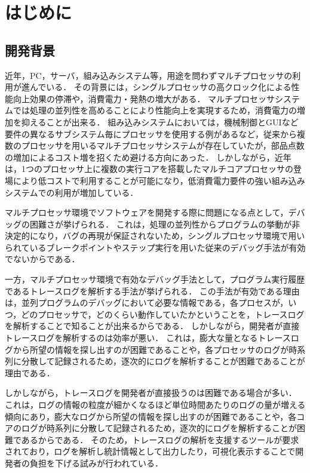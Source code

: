 \chapter{はじめに}

\section{開発背景}

近年，PC，サーバ，組み込みシステム等，用途を問わずマルチプロセッサの利用が進んでいる．
その背景には，シングルプロセッサの高クロック化による性能向上効果の停滞や，消費電力・発熱の増大がある．
マルチプロセッサシステムでは処理の並列性を高めることにより性能向上を実現するため，消費電力の増加を抑えることが出来る．
組み込みシステムにおいては，機械制御とGUIなど要件の異なるサブシステム毎にプロセッサを使用する例があるなど，従来から複数のプロセッサを用いるマルチプロセッサシステムが存在していたが，部品点数の増加によるコスト増を招くため避ける方向にあった．
しかしながら，近年は，1つのプロセッサ上に複数の実行コアを搭載したマルチコアプロセッサの登場により低コストで利用することが可能になり，低消費電力要件の強い組み込みシステムでの利用が増加している．

マルチプロセッサ環境でソフトウェアを開発する際に問題になる点として，デバッグの困難さが挙げられる．
これは，処理の並列性からプログラムの挙動が非決定的になり，バグの再現が保証されないため，シングルプロセッサ環境で用いられているブレークポイントやステップ実行を用いた従来のデバッグ手法が有効でないからである．

一方，マルチプロセッサ環境で有効なデバッグ手法として，プログラム実行履歴であるトレースログを解析する手法が挙げられる．
この手法が有効である理由は，並列プログラムのデバッグにおいて必要な情報である，各プロセスが，いつ，どのプロセッサで，どのくらい動作していたかということを，トレースログを解析することで知ることが出来るからである．
しかしながら，開発者が直接トレースログを解析するのは効率が悪い．
これは，膨大な量となるトレースログから所望の情報を探し出すのが困難であることや，各プロセッサのログが時系列に分散して記録されるため，逐次的にログを解析することが困難であることが理由である．

しかしながら，トレースログを開発者が直接扱うのは困難である場合が多い．
これは，ログの情報の粒度が細かくなるほど単位時間あたりのログの量が増える傾向にあり，膨大なログから所望の情報を探し出すのが困難であることや，各コアのログが時系列に分散して記録されるため，逐次的にログを解析することが困難であるからである．
そのため，トレースログの解析を支援するツールが要求されており，ログを解析し統計情報として出力したり，可視化表示することで開発者の負担を下げる試みが行われている．

